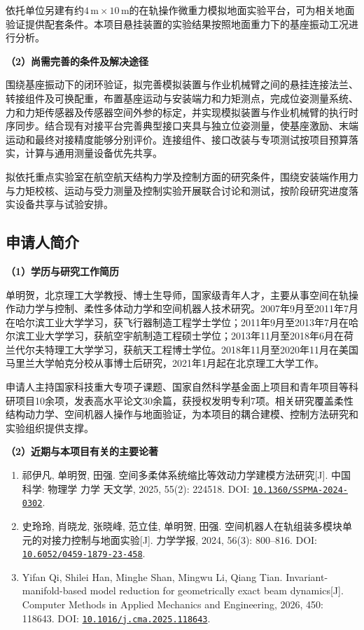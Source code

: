 \documentclass[UTF8,a4paper,zihao=-4,fontset=fandol]{ctexart}
\newcommand{\topic}[1]{\par\Needspace{4\baselineskip}\addvspace{0.5em}\noindent\textbf{#1}\par\nobreak}
\newcommand{\doi}[1]{\href{https://doi.org/#1}{\nolinkurl{#1}}}
\begin{document}
依托单位另建有约$4\,\mathrm m\times10\,\mathrm m$的在轨操作微重力模拟地面实验平台，可为相关地面验证提供配套条件。本项目悬挂装置的实验结果按照地面重力下的基座振动工况进行分析。

\topic{（2）尚需完善的条件及解决途径}

围绕基座振动下的闭环验证，拟完善模拟装置与作业机械臂之间的悬挂连接法兰、转接组件及可换配重，布置基座运动与安装端力和力矩测点，完成位姿测量系统、力和力矩传感器及传感器空间外参的标定，并实现模拟装置与作业机械臂的执行时序同步。结合现有对接平台完善典型接口夹具与独立位姿测量，使基座激励、末端运动和最终对接精度能够分别评价。连接组件、接口改装与专项测试按项目预算落实，计算与通用测量设备优先共享。

拟依托重点实验室在航空航天结构力学及控制方面的研究条件，围绕安装端作用力与力矩校核、运动与受力测量及控制实验开展联合讨论和测试，按阶段研究进度落实设备共享与试验安排。


\subsection{申请人简介}

\topic{（1）学历与研究工作简历}

单明贺，北京理工大学教授、博士生导师，国家级青年人才，主要从事空间在轨操作动力学与控制、柔性多体动力学和空间机器人技术研究。2007年9月至2011年7月在哈尔滨工业大学学习，获飞行器制造工程学士学位；2011年9月至2013年7月在哈尔滨工业大学学习，获航空宇航制造工程硕士学位；2013年11月至2018年6月在荷兰代尔夫特理工大学学习，获航天工程博士学位。2018年11月至2020年11月在美国马里兰大学帕克分校从事博士后研究，2021年1月起在北京理工大学工作。

申请人主持国家科技重大专项子课题、国家自然科学基金面上项目和青年项目等科研项目10余项，发表高水平论文30余篇，获授权发明专利7项。相关研究覆盖柔性结构动力学、空间机器人操作与地面验证，为本项目的耦合建模、控制方法研究和实验组织提供支撑。

\topic{（2）近期与本项目有关的主要论著}

\begin{enumerate}[label=\arabic*.]
 \item \begin{minipage}[t]{\linewidth}祁伊凡, 单明贺, 田强. 空间多柔体系统缩比等效动力学建模方法研究[J]. 中国科学: 物理学 力学 天文学, 2025, 55(2): 224518. DOI: \doi{10.1360/SSPMA-2024-0302}.
 \end{minipage}
 \item \begin{minipage}[t]{\linewidth}史玲玲, 肖晓龙, 张晓峰, 范立佳, 单明贺, 田强. 空间机器人在轨组装多模块单元的对接力控制与地面实验[J]. 力学学报, 2024, 56(3): 800--816. DOI: \doi{10.6052/0459-1879-23-458}.
 \end{minipage}
 \item \begin{minipage}[t]{\linewidth}Yifan Qi, Shilei Han, Minghe Shan, Mingwu Li, Qiang Tian. Invariant-manifold-based model reduction for geometrically exact beam dynamics[J]. Computer Methods in Applied Mechanics and Engineering, 2026, 450: 118643. DOI: \doi{10.1016/j.cma.2025.118643}.
 \end{minipage}
\end{enumerate}
\end{document}
